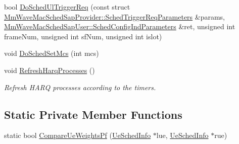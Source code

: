 \begin{DoxyCompactItemize}
\item 
bool \hyperlink{classns3_1_1MmWaveFlexTtiPfMacScheduler_a1c506121a3eeb25fc743b59a11f34e9b}{Do\+Sched\+Ul\+Trigger\+Req} (const struct \hyperlink{structns3_1_1MmWaveMacSchedSapProvider_1_1SchedTriggerReqParameters}{Mm\+Wave\+Mac\+Sched\+Sap\+Provider\+::\+Sched\+Trigger\+Req\+Parameters} \&params, \hyperlink{structns3_1_1MmWaveMacSchedSapUser_1_1SchedConfigIndParameters}{Mm\+Wave\+Mac\+Sched\+Sap\+User\+::\+Sched\+Config\+Ind\+Parameters} \&ret, unsigned int frame\+Num, unsigned int sf\+Num, unsigned int islot)
\item 
void \hyperlink{classns3_1_1MmWaveFlexTtiPfMacScheduler_a4abcbe7179cb870fcb145dc9dc2f6962}{Do\+Sched\+Set\+Mcs} (int mcs)
\item 
void \hyperlink{classns3_1_1MmWaveFlexTtiPfMacScheduler_a30881fe7ba728467c507b8a59e670d8d}{Refresh\+Harq\+Processes} ()
\begin{DoxyCompactList}\small\item\em Refresh H\+A\+RQ processes according to the timers. \end{DoxyCompactList}\end{DoxyCompactItemize}
\subsection*{Static Private Member Functions}
\begin{DoxyCompactItemize}
\item 
static bool \hyperlink{classns3_1_1MmWaveFlexTtiPfMacScheduler_a6dfff91235926b82f832a910f6962d95}{Compare\+Ue\+Weights\+Pf} (\hyperlink{structns3_1_1MmWaveFlexTtiPfMacScheduler_1_1UeSchedInfo}{Ue\+Sched\+Info} $\ast$lue, \hyperlink{structns3_1_1MmWaveFlexTtiPfMacScheduler_1_1UeSchedInfo}{Ue\+Sched\+Info} $\ast$rue)
\end{DoxyCompactItemize}
